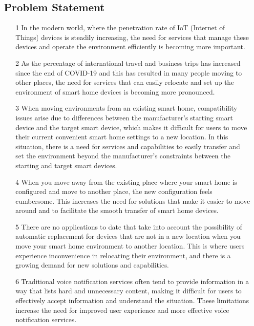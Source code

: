 \documentclass[conference]{IEEEtran}
\begin{document}
\subsection{Problem Statement}
\begin{itemize}
\item [1] In the modern world, where the penetration rate of IoT (Internet of Things) devices is steadily increasing, the need for services that manage these devices and operate the environment efficiently is becoming more important. \\
\item [2] As the percentage of international travel and business trips has increased since the end of COVID-19 and this has resulted in many people moving to other places, the need for services that can easily relocate and set up the environment of smart home devices is becoming more pronounced.\\
\item [3] When moving environments from an existing smart home, compatibility issues arise due to differences between the manufacturer's starting smart device and the target smart device, which makes it difficult for users to move their current convenient smart home settings to a new location. In this situation, there is a need for services and capabilities to easily transfer and set the environment beyond the manufacturer's constraints between the starting and target smart devices.
\\
\item [4] When you move away from the existing place where your smart home is configured and move to another place, the new configuration feels cumbersome. This increases the need for solutions that make it easier to move around and to facilitate the smooth transfer of smart home devices.
\\
\item [5] There are no applications to date that take into account the possibility of automatic replacement for devices that are not in a new location when you move your smart home environment to another location. This is where users experience inconvenience in relocating their environment, and there is a growing demand for new solutions and capabilities.
\\\item [6] Traditional voice notification services often tend to provide information in a way that lists hard and unnecessary content, making it difficult for users to effectively accept information and understand the situation. These limitations increase the need for improved user experience and more effective voice notification services.
\end{itemize}
\end{document}

